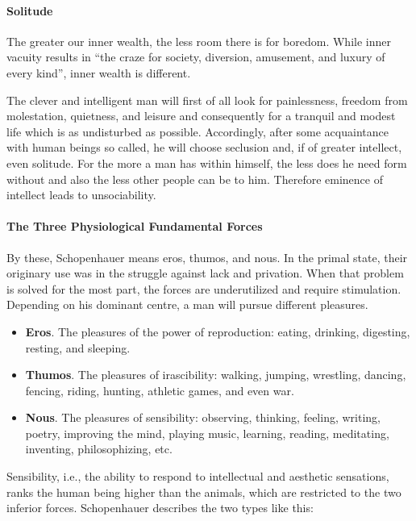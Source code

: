 \paragraph{Solitude}
The greater our inner wealth, the less room there is for boredom. While inner vacuity results in “the craze for society,
diversion, amusement, and luxury of every kind”, inner wealth is different.

\begin{quotex}
The clever and intelligent man will first of all look for painlessness, freedom from molestation, quietness, and leisure
and consequently for a tranquil and modest life which is as undisturbed as possible. Accordingly, after some
acquaintance with human beings so called, he will choose seclusion and, if of greater intellect, even solitude. For the
more a man has within himself, the less does he need form without and also the less other people can be to him.
Therefore eminence of intellect leads to unsociability. 

\end{quotex}
\paragraph{The Three Physiological Fundamental Forces}
By these, Schopenhauer means eros, thumos, and nous. In the primal state, their originary use was in the struggle
against lack and privation. When that problem is solved for the most part, the forces are underutilized and require
stimulation. Depending on his dominant centre, a man will pursue different pleasures.

\begin{itemize}
\item \textbf{Eros}. The pleasures of the power of reproduction: eating, drinking, digesting, resting, and sleeping. 
\item \textbf{Thumos}. The pleasures of irascibility: walking, jumping, wrestling, dancing, fencing, riding, hunting,
athletic games, and even war. 
\item \textbf{Nous}. The pleasures of sensibility: observing, thinking, feeling, writing, poetry, improving the mind,
playing music, learning, reading, meditating, inventing, philosophizing, etc. 
\end{itemize}
Sensibility, i.e., the ability to respond to intellectual and aesthetic sensations, ranks the human being higher than
the animals, which are restricted to the two inferior forces. Schopenhauer describes the two types like this:

